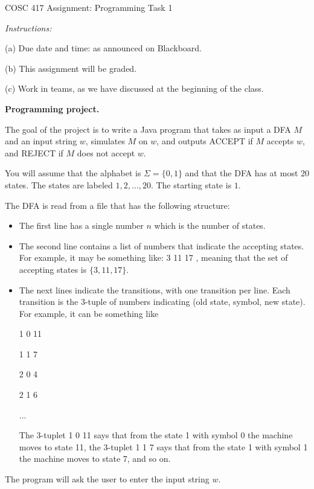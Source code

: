 \documentclass[11pt]{article}
\begin{document}
{\Large COSC 417 \hspace{2cm} Assignment: Programming Task 1 }
\vspace{0.5cm}

\emph{Instructions:}

(a) Due date and time: as announced on Blackboard.

(b) This assignment will be graded.

(c) Work in teams, as we have discussed at the beginning of the class.

\vspace{0.5cm}

\textbf{Programming project.}
\medskip

The goal of the project is to write a Java program that takes as input a DFA $M$ and an input string $w$,  simulates $M$ on $w$, and outputs ACCEPT if $M$ accepts $w$, and REJECT if $M$ does not accept $w$.


You will assume that the alphabet is $\Sigma = \{0,1\}$ and that the DFA has at most $20$ states. The states are labeled $1,2, \ldots, 20$.  The starting state is $1$.

The DFA is read from a file that has the following structure:

\begin{itemize}
  \item The first line has a single number $n$ which is the number of states.
  \item  The second line contains a list of numbers that indicate the accepting states. For example, it may be something like: 3 11 17 , meaning that the set of accepting states is $\{3, 11, 17\}$.
  \item The next lines indicate the transitions, with one transition per line. Each transition is the 3-tuple of numbers indicating (old state, symbol, new state).
        For example, it can be something like

        1  0 11

        1 1  7

        2 0 4

        2 1 6

        ...


        The 3-tuplet  1 0 11 says that from the state 1 with symbol 0 the machine moves to state 11,  the 3-tuplet  1 1 7 says that from the state 1 with symbol 1 the machine moves to state 7, and so on.

\end{itemize}

The program will ask the user to enter the input string $w$.
\end{document}
